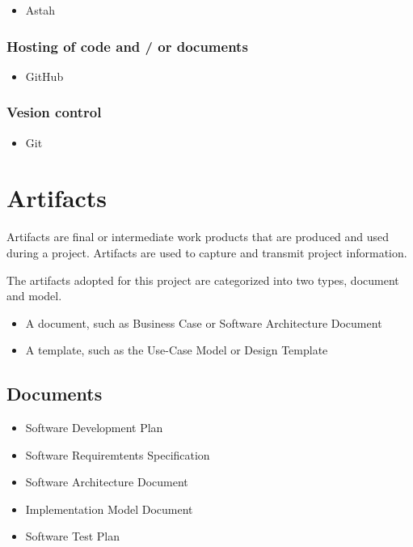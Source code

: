 \documentclass[11pt, twoside, a4paper]{book}
\begin{document}
						\begin{itemize}
							\item Astah
						\end{itemize}											
					
					\subsubsection{Hosting of code and / or documents}
        				
        				\begin{itemize}
        					\item GitHub
        				\end{itemize}
        				
					\subsubsection{Vesion control}
					
						\begin{itemize}
							\item Git
						\end{itemize}
						
			\section{Artifacts}
			
				Artifacts are final or intermediate work products that are produced and used during a project. Artifacts are used to capture and transmit project information.

				The artifacts adopted for this project are categorized into two types, document and model.
				
				\begin{itemize}
					\item A document, such as Business Case or Software Architecture Document 
					\item A template, such as the Use-Case Model or Design Template
				\end{itemize}
				
				\subsection{Documents}
				
					\begin{itemize}
						\item Software Development Plan
						\item Software Requiremtents Specification
						\item Software Architecture Document
						\item Implementation Model Document
						\item Software Test Plan
					\end{itemize}					
					
\end{document}
